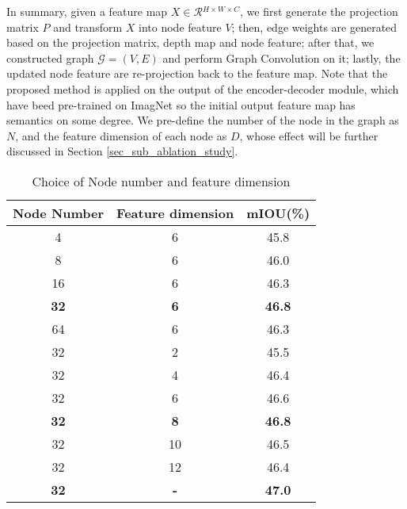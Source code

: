 ﻿\documentclass[journal]{IEEEtran}
\begin{document}
        In summary, given a feature map ${X} \in \mathcal{R}{^{H\times W\times C}}$, we first generate the projection matrix ${P}$ and transform $X$ into node feature $V$; then, edge weights are generated based on the projection matrix, depth map and node feature; after that, we constructed graph  $\mathcal{G}=(V, E)$ and perform Graph Convolution on it; lastly, the updated node feature are re-projection back to the feature map. Note that the proposed method is applied on the output of the encoder-decoder module, which have beed pre-trained on ImagNet so the initial output feature map has semantics on some degree. We pre-define the number of the node in the graph as $N$, and the feature dimension of each node as $D$, whose effect will be further discussed in Section \ref{sec_sub_ablation_study}. \\   
            
\begin{table}
    \caption{Choice of Node number and feature dimension}
    \label{table_ablation_node_dim}
    \centering
    \begin{tabular}{c|c|c}
        \hline
        Node Number & Feature dimension  & mIOU(\%) \\
        \hline
        4 & 6 & 45.8 \\
        8 & 6 & 46.0 \\
        16 & 6 & 46.3 \\
        \textbf{32} & \textbf{6} & \textbf{46.8}\\
        64 & 6 & 46.3 \\
        \hline
        32 & 2 & 45.5 \\
        32 & 4 & 46.4 \\
        32 & 6 & 46.6 \\
        \textbf{32} & \textbf{8} & \textbf{46.8} \\
        32 & 10 & 46.5 \\
        32 & 12 & 46.4 \\
        \hline
        \textbf{32} & \textbf{-} & \textbf{47.0} \\
        \hline
    \end{tabular}
    \end{table}
\end{document}
